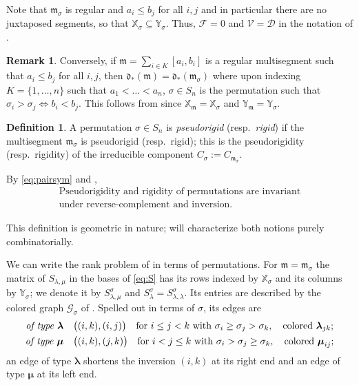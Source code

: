 \documentclass[12pt]{article}
\def\xspace{ }%
\theoremstyle{definition}
\newtheorem{definition}[definition]{Definition}
\newtheorem{remark}[remark]{Remark}
\newcommand{\prig}{pseudorigid\xspace}
\newcommand{\prigity}{pseudorigidity\xspace}
\newcommand{\Prigity}{Pseudorigidity\xspace}
\newcommand{\cmp}{C}                       %
\newcommand{\mm}{\mathfrak{m}}
\newcommand{\bmdl}{\mathcal{D}}   %
\newcommand{\XX}{\mathbb{X}}  %
\newcommand{\YY}{\mathbb{Y}}  %
\newcommand{\Kk}{K}         %
\newcommand{\Ff}{\mathcal{F}}   %
\newcommand{\Vv}{\mathcal{V}}   %
\newcommand{\dfr}{\mathfrak{d}}  %
\newcommand{\Sop}{S}
\newcommand{\rsub}{\sharp}       %
\newcommand{\psub}{\flat}        %
\newcommand{\Gc}{\mathcal{G}}          %
\newcommand{\blam}{\boldsymbol{\lambda}}   %
\newcommand{\bmu}{\boldsymbol{\mu}}        %
\begin{document}
Note that $\mm_\sigma$ is regular and $a_i\le b_j$ for all $i,j$ and in particular there are no juxtaposed segments, so that $\XX_\sigma \subseteq \YY_\sigma$.
Thus, $\Ff = 0$ and $\Vv =\bmdl$ in the notation of .

\begin{remark}\label{rem:reggen}
Conversely, if $\mm=\sum_{i\in \Kk}[a_i,b_i]$ is a regular multisegment such that $a_i\le b_j$ for all $i,j$, then
$\dfr_*(\mm)=\dfr_*(\mm_\sigma)$ where upon indexing $\Kk = \{1,\dots,n\}$ such that $a_1 < \dots < a_n$,
$\sigma\in S_n$ is the permutation such that $\sigma_i > \sigma_j \iff b_i < b_j$.
This follows from  since $\XX_\mm = \XX_\sigma$ and $\YY_\mm =\YY_\sigma$.
\end{remark}



\begin{definition}\label{def:prigperm}
A permutation $\sigma \in S_n$ is \emph{\prig} (resp.\ \emph{rigid}) if
the multisegment $\mm_\sigma$ is \prig (resp.\ rigid);
this is the \prigity (resp.\ rigidity) of the irreducible component
$\cmp_\sigma := \cmp_{\mm_\sigma}$.
\end{definition}

By \eqref{eq:pairsym} and ,
\begin{equation} \label{quot:klein}
\begin{gathered}
\text{\Prigity and rigidity of permutations are invariant}\\\text{under reverse-complement and inversion.}
\end{gathered}
\end{equation}


This definition is geometric in nature;  will characterize both notions purely combinatorially.

We can write the rank problem of  in terms of permutations.
For $\mm = \mm_\sigma$ the matrix of $\Sop_{\lambda,\mu}$ in the
bases of \eqref{eq:S} has its rows indexed by $\XX_\sigma$ and its
columns by $\YY_\sigma$; we denote it by $\Sop^\sigma_{\lambda,\mu}$ and
$\Sop^\sigma_\lambda = \Sop^\sigma_{\lambda,\lambda}$. Its entries are
described by the colored graph $\Gc_\sigma$ of . Spelled out
in terms of $\sigma$, its edges are
\begin{align*}
\text{\emph{of type $\blam$}}\quad & \bigl((i,k),(i,j)\bigr)
   \quad\text{for } i \le j < k \text{ with } \sigma_i \ge \sigma_j >
   \sigma_k, \quad\text{colored } \blam_{jk};\\
\text{\emph{of type $\bmu$}}\quad & \bigl((i,k),(j,k)\bigr)
   \quad\text{for } i < j \le k \text{ with } \sigma_i > \sigma_j \ge
   \sigma_k, \quad\text{colored } \bmu_{ij};
\end{align*}
an edge of type $\blam$ shortens the inversion $(i,k)$ at its right end
and an edge of type $\bmu$ at its left end.
\end{document}
